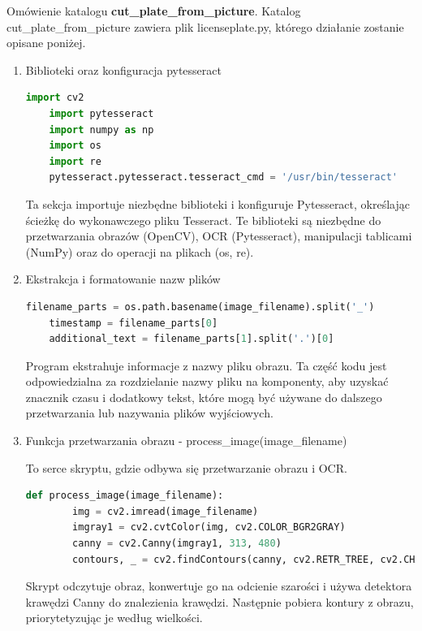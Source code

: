 \documentclass[12pt,a4paper,oneside]{article}
\theoremstyle{definition}
\numberwithin{equation}{section}
\begin{document}
Omówienie katalogu \textbf{cut{\_}plate{\_}from{\_}picture}. Katalog {cut{\_}plate{\_}from{\_}picture} zawiera plik licenseplate.py, którego działanie zostanie opisane poniżej.
\begin{enumerate}

\item Biblioteki oraz konfiguracja pytesseract 

\begin{lstlisting}[language=Python]
    import cv2
    import pytesseract
    import numpy as np
    import os
    import re
    pytesseract.pytesseract.tesseract_cmd = '/usr/bin/tesseract'
\end{lstlisting}

 Ta sekcja importuje niezbędne biblioteki i konfiguruje Pytesseract, określając ścieżkę do wykonawczego pliku Tesseract. Te biblioteki są niezbędne do przetwarzania obrazów (OpenCV), OCR (Pytesseract), manipulacji tablicami (NumPy) oraz do operacji na plikach (os, re).


\item Ekstrakcja i formatowanie nazw plików

\begin{lstlisting}[language=Python]
    filename_parts = os.path.basename(image_filename).split('_')
    timestamp = filename_parts[0]
    additional_text = filename_parts[1].split('.')[0]
\end{lstlisting} 

Program ekstrahuje informacje z nazwy pliku obrazu. Ta część kodu jest odpowiedzialna za rozdzielanie nazwy pliku na komponenty, aby uzyskać znacznik czasu i dodatkowy tekst, które mogą być używane do dalszego przetwarzania lub nazywania plików wyjściowych.


\item Funkcja przetwarzania obrazu - process{\_}image(image{\_}filename)


To serce skryptu, gdzie odbywa się przetwarzanie obrazu i OCR.


\begin{lstlisting}[language=Python]
    def process_image(image_filename):
        img = cv2.imread(image_filename)
        imgray1 = cv2.cvtColor(img, cv2.COLOR_BGR2GRAY)
        canny = cv2.Canny(imgray1, 313, 480)
        contours, _ = cv2.findContours(canny, cv2.RETR_TREE, cv2.CHAIN_APPROX_NONE)
\end{lstlisting}

Skrypt odczytuje obraz, konwertuje go na odcienie szarości i używa detektora krawędzi Canny do znalezienia krawędzi. Następnie pobiera kontury z obrazu, priorytetyzując je według wielkości.


\end{enumerate}
\end{document}
